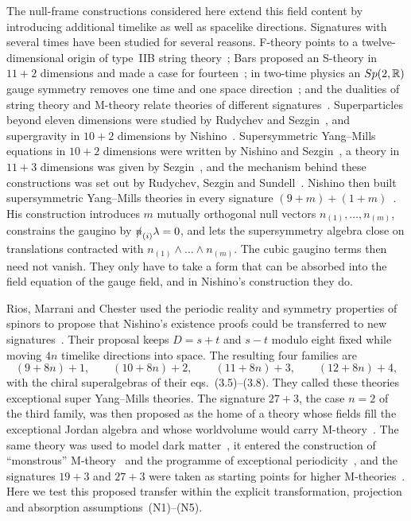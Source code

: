 The null-frame constructions considered here extend this field content by introducing additional timelike as well as spacelike directions. Signatures with several times have been studied for several reasons. F-theory points to a twelve-dimensional origin of type~IIB string theory~\cite{Vafa1996}; Bars proposed an S-theory in $11+2$ dimensions and made a case for fourteen~\cite{Bars1997,Bars1997b}; in two-time physics an $Sp(2,\mathbb{R})$ gauge symmetry removes one time and one space direction~\cite{BarsKounnas1997,BarsDelidumanAndreev1998,Bars2000}; and the dualities of string theory and M-theory relate theories of different signatures~\cite{Hull1998,Hull1998b}. Superparticles beyond eleven dimensions were studied by Rudychev and Sezgin~\cite{RudychevSezgin1997}, and supergravity in $10+2$ dimensions by Nishino~\cite{Nishino1998b}. Supersymmetric Yang--Mills equations in $10+2$ dimensions were written by Nishino and Sezgin~\cite{NishinoSezgin1996}, a theory in $11+3$ dimensions was given by Sezgin~\cite{Sezgin1997}, and the mechanism behind these constructions was set out by Rudychev, Sezgin and Sundell~\cite{RudychevSezginSundell1998}. Nishino then built supersymmetric Yang--Mills theories in every signature $(9+m)+(1+m)$~\cite{Nishino1998}. His construction introduces $m$ mutually orthogonal null vectors $n_{(1)},\dots,n_{(m)}$, constrains the gaugino by $\slashed{n}_{(i)}\lambda=0$, and lets the supersymmetry algebra close on translations contracted with $n_{(1)}\wedge\dots\wedge n_{(m)}$. The cubic gaugino terms then need not vanish. They only have to take a form that can be absorbed into the field equation of the gauge field, and in Nishino's construction they do.

Rios, Marrani and Chester used the periodic reality and symmetry properties of spinors to propose that Nishino's existence proofs could be transferred to new signatures~\cite[Sec.~III.A]{RiosMarraniChester2019}. Their proposal keeps $D=s+t$ and $s-t$ modulo eight fixed while moving $4n$ timelike directions into space. The resulting four families are
\begin{equation}
\label{eq:families}
(9+8n)+1,\qquad (10+8n)+2,\qquad (11+8n)+3,\qquad (12+8n)+4 ,
\end{equation}
with the chiral superalgebras of their eqs.~(3.5)--(3.8). They called these theories exceptional super Yang--Mills theories. The signature $27+3$, the case $n=2$ of the third family, was then proposed as the home of a theory whose fields fill the exceptional Jordan algebra and whose worldvolume would carry M-theory~\cite{RiosMarraniChester2020}. The same theory was used to model dark matter~\cite{PaduroiuRiosMarraniChester2021}, it entered the construction of ``monstrous'' M-theory~\cite{MarraniRiosChester2023} and the programme of exceptional periodicity~\cite{TruiniMarraniRios2019}, and the signatures $19+3$ and $27+3$ were taken as starting points for higher M-theories~\cite{Banerjee2024}. Here we test this proposed transfer within the explicit transformation, projection and absorption assumptions~(N1)--(N5).

